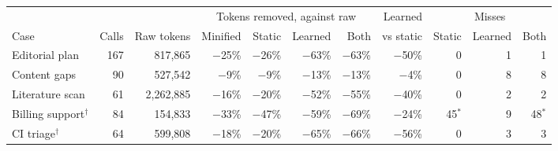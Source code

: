 \begin{tabular}{lrrrrrrrrrr}
\toprule
& & & \multicolumn{4}{c}{Tokens removed, against raw} & Learned & \multicolumn{3}{c}{Misses} \\
\cmidrule(lr){4-7}\cmidrule(lr){9-11}
Case & Calls & Raw tokens & Minified & Static & Learned & Both & vs static & Static & Learned & Both \\
\midrule
Editorial plan & 167 & 817{,}865 & $-$25\% & $-$26\% & $-$63\% & $-$63\% & $-$50\% & 0 & 1 & 1 \\
Content gaps & 90 & 527{,}542 & $-$9\% & $-$9\% & $-$13\% & $-$13\% & $-$4\% & 0 & 8 & 8 \\
Literature scan & 61 & 2{,}262{,}885 & $-$16\% & $-$20\% & $-$52\% & $-$55\% & $-$40\% & 0 & 2 & 2 \\
Billing support$^\dagger$ & 84 & 154{,}833 & $-$33\% & $-$47\% & $-$59\% & $-$69\% & $-$24\% & 45$^{\ast}$ & 9 & 48$^{\ast}$ \\
CI triage$^\dagger$ & 64 & 599{,}808 & $-$18\% & $-$20\% & $-$65\% & $-$66\% & $-$56\% & 0 & 3 & 3 \\
\bottomrule
\end{tabular}
